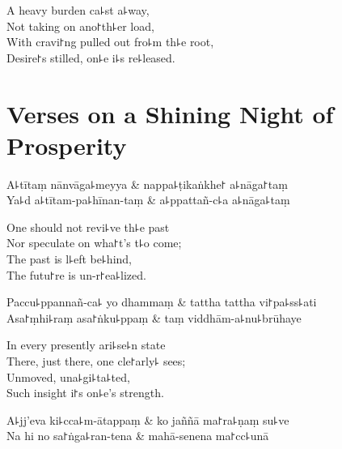 \begin{english}
  A heavy burden ca꜕st a꜕way,\\
  Not taking on ano꜓th꜕er load,\\
  With cravi꜓ng pulled out fro꜕m th꜕e root,\\
  Desire꜓s stilled, on꜕e i꜕s re꜕leased.
\end{english}

\chapter{Verses on a Shining Night of Prosperity}%



\begin{leader}
\end{leader}

\begin{twochants}
  A꜕tītaṃ nānvāga꜕meyya & nappa꜕ṭikaṅkhe꜓ a꜕nāga꜓taṃ \\
  Ya꜕d a꜕tītam-pa꜕hīnan-taṃ & a꜕ppattañ-c꜕a a꜕nāga꜕taṃ \\
\end{twochants}

\begin{english}
  One should not revi꜕ve th꜕e past\\
  Nor speculate on wha꜓t's t꜕o come;\\
  The past is l꜕eft be꜕hind,\\
  The futu꜓re is un-r꜓ea꜕lized.
\end{english}

\begin{twochants}
  Paccu꜕ppannañ-ca꜕ yo dhammaṃ & tattha tattha vi꜓pa꜕ss꜕ati \\
  Asa꜓ṃhi꜕raṃ asa꜓ṅku꜕ppaṃ & taṃ viddhām-a꜕nu꜕brūhaye \\
\end{twochants}

\begin{english}
  In every presently ari꜕se꜕n state\\
  There, just there, one cle꜓arly꜕ sees;\\
  Unmoved, una꜕gi꜕ta꜕ted,\\
  Such insight i꜓s on꜕e's strength.
\end{english}

\begin{twochants}
  A꜕jj'eva ki꜕cca꜕m-ātappaṃ & ko jaññā ma꜓ra꜕ṇaṃ su꜕ve \\
  Na hi no sa꜓ṅga꜕ran-tena & mahā-senena ma꜓cc꜕unā \\
\end{twochants}

